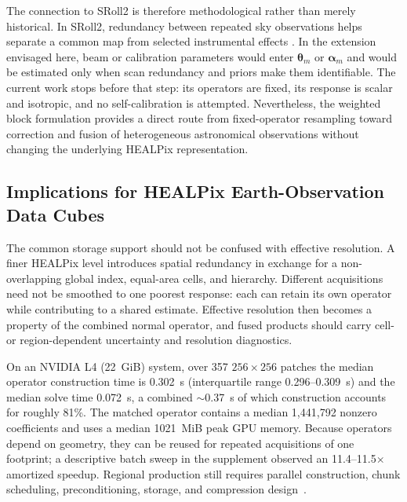 \documentclass[journal]{IEEEtran}
\newcommand{\healpix}{HEALPix\xspace}
\begin{document}
The connection to SRoll2 is therefore methodological rather than merely
historical. In SRoll2, redundancy between repeated sky observations helps
separate a common map from selected instrumental effects
\cite{delouis2019sroll2}. In the extension envisaged here, beam or calibration
parameters would enter $\boldsymbol\theta_m$ or
$\boldsymbol\alpha_m$ and would be estimated only when scan redundancy and
priors make them identifiable. The current work stops before that step: its
operators are fixed, its response is scalar and isotropic, and no
self-calibration is attempted. Nevertheless, the weighted block formulation
provides a direct route from fixed-operator resampling toward correction and
fusion of heterogeneous astronomical observations without changing the
underlying \healpix representation.

\subsection{Implications for HEALPix Earth-Observation Data Cubes}
\label{sec:hpx_datacube_implications}

The common storage support should not be confused with effective resolution.
A finer \healpix level introduces spatial redundancy in exchange for a
non-overlapping global index, equal-area cells, and hierarchy. Different
acquisitions need not be smoothed to one poorest response: each can retain
its own operator while contributing to a shared estimate. Effective
resolution then becomes a property of the combined normal operator, and
fused products should carry cell- or region-dependent uncertainty and
resolution diagnostics.

On an NVIDIA L4 (22~GiB) system, over 357 $256\times256$ patches the
median operator construction time is 0.302~s (interquartile range
0.296--0.309~s) and the median solve time 0.072~s, a combined
$\sim$0.37~s of which construction accounts for roughly 81\%.
The matched operator contains a median 1,441,792 nonzero coefficients and
uses a median 1021~MiB peak GPU memory. Because operators depend on geometry,
they can be reused for repeated acquisitions of one footprint; a descriptive
batch sweep in the supplement observed an 11.4--11.5$\times$ amortized
speedup. Regional production still requires parallel construction, chunk
scheduling, preconditioning, storage, and compression design~\cite{delouis2026compress}.
\end{document}
